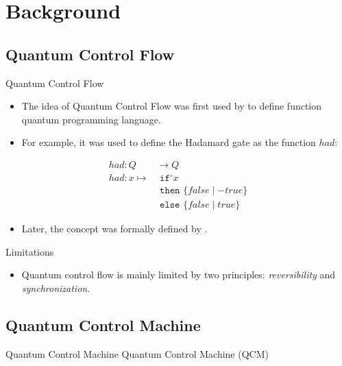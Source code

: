 \section{Background}
\subsection{Quantum Control Flow}
\begin{frame}{Quantum Control Flow}
    
    \begin{itemize}
        \item The idea of Quantum Control Flow was first used by \cite{AlGr05} to define function quantum programming language.
        \item For example, it was used to define the Hadamard gate as the function $had$:  
    \end{itemize}
    \begin{align*}
        had : Q& \to Q\\
        had : x \mapsto& \texttt{ if}^\circ x\\
                       & \texttt{ then } \{false \mid -true\}\\
                       & \texttt{ else } \{false \mid true\}
    \end{align*}
    \begin{itemize}
        \item Later, the concept was formally defined by \cite{YYF12}.
    \end{itemize}
\end{frame}
\begin{frame}{Limitations}
    \begin{itemize}
        \item Quantum control flow is mainly limited by two principles: \emph{reversibility} and \emph{synchronization}.
    \end{itemize}
\end{frame}

\subsection{Quantum Control Machine}
\begin{frame}{Quantum Control Machine}
    Quantum Control Machine (QCM)~\cite{YVC24}
\end{frame}
